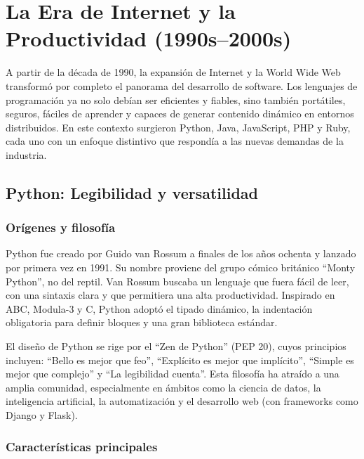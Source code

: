 \chapter{La Era de Internet y la Productividad (1990s–2000s)}

A partir de la década de 1990, la expansión de Internet y la World Wide Web transformó por completo el panorama del desarrollo de software. Los lenguajes de programación ya no solo debían ser eficientes y fiables, sino también portátiles, seguros, fáciles de aprender y capaces de generar contenido dinámico en entornos distribuidos. En este contexto surgieron Python, Java, JavaScript, PHP y Ruby, cada uno con un enfoque distintivo que respondía a las nuevas demandas de la industria.

\section{Python: Legibilidad y versatilidad}

\subsection{Orígenes y filosofía}

Python fue creado por Guido van Rossum a finales de los años ochenta y lanzado por primera vez en 1991. Su nombre proviene del grupo cómico británico ``Monty Python'', no del reptil. Van Rossum buscaba un lenguaje que fuera fácil de leer, con una sintaxis clara y que permitiera una alta productividad. Inspirado en ABC, Modula-3 y C, Python adoptó el tipado dinámico, la indentación obligatoria para definir bloques y una gran biblioteca estándar.

El diseño de Python se rige por el ``Zen de Python'' (PEP 20), cuyos principios incluyen: ``Bello es mejor que feo'', ``Explícito es mejor que implícito'', ``Simple es mejor que complejo'' y ``La legibilidad cuenta''. Esta filosofía ha atraído a una amplia comunidad, especialmente en ámbitos como la ciencia de datos, la inteligencia artificial, la automatización y el desarrollo web (con frameworks como Django y Flask).

\subsection{Características principales}

